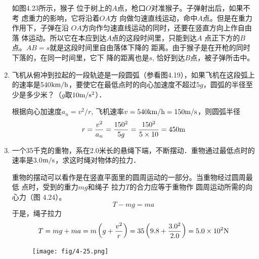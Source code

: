 \begin{enumerate}
\begin{solution}
如图4.23所示，猴子
位于树上的$A$点，枪口$O$对准猴子。子弹射出后，如果不考
虑重力的影响，它将沿着$OA$方
向做匀速直线运动，命中$A$点。但是在重力作用下，子弹在沿
$OA$方向作匀速直线运动的同时，还要在竖直方向上作自由落
体运动。所以它在本应到达$A$点的这段时间里，只能到达$A$
点正下方的$B$点。$AB=s$就是这段时间里自由落体下降的
距离。由于猴子是在开枪的同时下落的，在同一时间里，它下
降的距离也是$s$, 恰好到达$B$点，被子弹所击中。
\end{solution}
\item  飞机从俯冲到拉起的一段轨迹是一段圆弧（参看图4.19），如果飞机在这段弧上的速率是540$\text{km}/\text{h}$，要使它在最低点时的向心加速度不超过$5g$，圆弧的半径至少是多少米？（$g$取$10\text{m}/\text{s}^2$）．

\begin{solution}
    根据向心加速度$a_n=v^2/r$, 飞机速率$v=540\text{km}/\text{h}=150\text{m}/\text{s}$，则圆弧半径
    \[r=\frac{v^2}{a_n}=\frac{150^2}{5g}=\frac{150^2}{5\times 10}=450{\rm m}\]
\end{solution}
\item  一个35千克的重物，系在2.0米长的悬绳下端，不断摆动．重物通过最低点时的速率是3.0$\text{m}/\text{s}$，求这时绳对物体的拉力．

\begin{solution}
    重物的摆动可以看作是在竖直平面里的圆周运动的一部分。当重物经过圆周最低
    点时，受到的重力$mg$和绳子
    拉力$T$的合力应等于重物作
    圆周运动所需的向心力（图
    4.24）。
\[T-mg=ma\]
于是，绳子拉力
\[T=mg+ma=m\left(g+\frac{v^2}{r}\right)=35\left(9.8+\frac{3.0^2}{2.0}\right)=5.0\times 10^2{\rm N}\]
\end{solution}

\begin{figure}[htp]\centering
    \begin{minipage}[t]{0.48\textwidth}
    \centering
{}
    \caption{}
    \end{minipage}
    \begin{minipage}[t]{0.48\textwidth}
    \centering
    \texttt{[image: fig/4-25.png]}
    \caption{}
    \end{minipage}
    \end{figure}


\end{enumerate}
